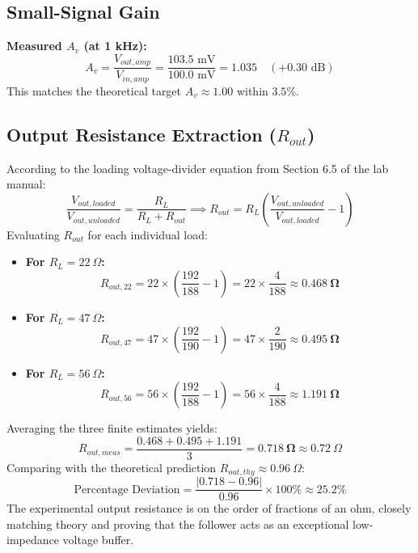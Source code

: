 \documentclass[11pt,a4paper]{article}
\begin{document}
\subsection{Small-Signal Gain}
\textbf{Measured $A_v$ (at 1 kHz):}
\begin{equation}
    A_v = \frac{V_{out, amp}}{V_{in, amp}} = \frac{103.5\text{ mV}}{100.0\text{ mV}} = \mathbf{1.035} \quad (+0.30\text{ dB})
\end{equation}
This matches the theoretical target $A_v \approx 1.00$ within $3.5\%$.

\subsection{Output Resistance Extraction ($R_{out}$)}
According to the loading voltage-divider equation from Section 6.5 of the lab manual:
\begin{equation}
    \frac{V_{out,loaded}}{V_{out,unloaded}} = \frac{R_L}{R_L + R_{out}} \implies R_{out} = R_L \left( \frac{V_{out,unloaded}}{V_{out,loaded}} - 1 \right)
\end{equation}
Evaluating $R_{out}$ for each individual load:
\begin{itemize}
    \item \textbf{For $R_L = 22\ \Omega$:} 
    \begin{equation}
        R_{out,22} = 22 \times \left( \frac{192}{188} - 1 \right) = 22 \times \frac{4}{188} \approx \mathbf{0.468\ \Omega}
    \end{equation}
    \item \textbf{For $R_L = 47\ \Omega$:} 
    \begin{equation}
        R_{out,47} = 47 \times \left( \frac{192}{190} - 1 \right) = 47 \times \frac{2}{190} \approx \mathbf{0.495\ \Omega}
    \end{equation}
    \item \textbf{For $R_L = 56\ \Omega$:} 
    \begin{equation}
        R_{out,56} = 56 \times \left( \frac{192}{188} - 1 \right) = 56 \times \frac{4}{188} \approx \mathbf{1.191\ \Omega}
    \end{equation}
\end{itemize}
Averaging the three finite estimates yields:
\begin{equation}
    R_{out,meas} = \frac{0.468 + 0.495 + 1.191}{3} = \mathbf{0.718\ \Omega} \approx 0.72\ \Omega
\end{equation}
Comparing with the theoretical prediction $R_{out,thy} \approx 0.96\ \Omega$:
\begin{equation}
    \text{Percentage Deviation} = \frac{|0.718 - 0.96|}{0.96} \times 100\% \approx \mathbf{25.2\%}
\end{equation}
The experimental output resistance is on the order of fractions of an ohm, closely matching theory and proving that the follower acts as an exceptional low-impedance voltage buffer.
\end{document}
